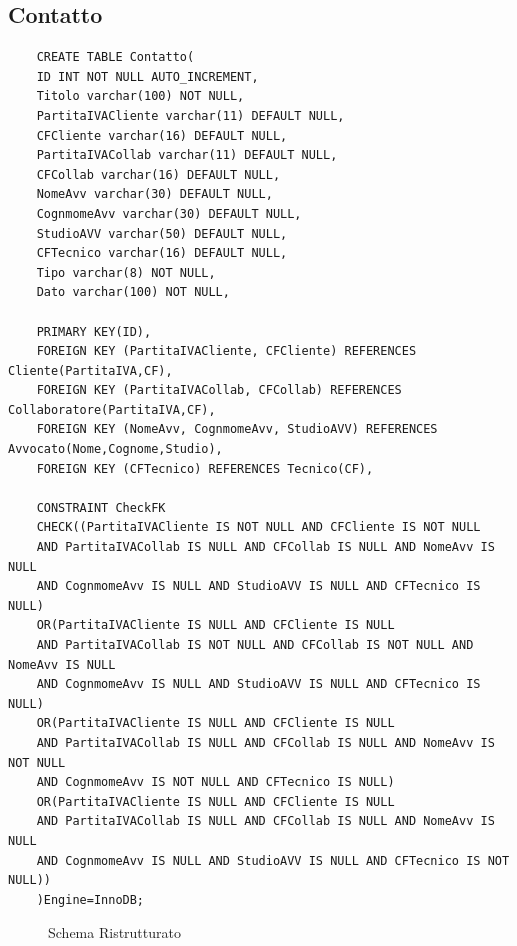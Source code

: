 \documentclass{elegantbook}
\begin{document}
\subsection{Contatto}
\begin{verbatim}
	CREATE TABLE Contatto(
	ID INT NOT NULL AUTO_INCREMENT,
	Titolo varchar(100) NOT NULL,
	PartitaIVACliente varchar(11) DEFAULT NULL,
	CFCliente varchar(16) DEFAULT NULL,
	PartitaIVACollab varchar(11) DEFAULT NULL,
	CFCollab varchar(16) DEFAULT NULL,
	NomeAvv varchar(30) DEFAULT NULL,
	CognmomeAvv varchar(30) DEFAULT NULL,
	StudioAVV varchar(50) DEFAULT NULL,
	CFTecnico varchar(16) DEFAULT NULL,
	Tipo varchar(8) NOT NULL,
	Dato varchar(100) NOT NULL,
	
	PRIMARY KEY(ID),
	FOREIGN KEY (PartitaIVACliente, CFCliente) REFERENCES Cliente(PartitaIVA,CF),
	FOREIGN KEY (PartitaIVACollab, CFCollab) REFERENCES Collaboratore(PartitaIVA,CF),
	FOREIGN KEY (NomeAvv, CognmomeAvv, StudioAVV) REFERENCES Avvocato(Nome,Cognome,Studio),
	FOREIGN KEY (CFTecnico) REFERENCES Tecnico(CF),
	
	CONSTRAINT CheckFK 
	CHECK((PartitaIVACliente IS NOT NULL AND CFCliente IS NOT NULL 
	AND PartitaIVACollab IS NULL AND CFCollab IS NULL AND NomeAvv IS NULL 
	AND CognmomeAvv IS NULL AND StudioAVV IS NULL AND CFTecnico IS NULL)
	OR(PartitaIVACliente IS NULL AND CFCliente IS NULL 
	AND PartitaIVACollab IS NOT NULL AND CFCollab IS NOT NULL AND NomeAvv IS NULL 
	AND CognmomeAvv IS NULL AND StudioAVV IS NULL AND CFTecnico IS NULL)
	OR(PartitaIVACliente IS NULL AND CFCliente IS NULL 
	AND PartitaIVACollab IS NULL AND CFCollab IS NULL AND NomeAvv IS NOT NULL 
	AND CognmomeAvv IS NOT NULL AND CFTecnico IS NULL)
	OR(PartitaIVACliente IS NULL AND CFCliente IS NULL 
	AND PartitaIVACollab IS NULL AND CFCollab IS NULL AND NomeAvv IS NULL 
	AND CognmomeAvv IS NULL AND StudioAVV IS NULL AND CFTecnico IS NOT NULL))
	)Engine=InnoDB;
\end{verbatim}
\begin{figure}[H]
	\centering
	\caption{Schema Ristrutturato}
\end{figure}
\newpage
\end{document}
